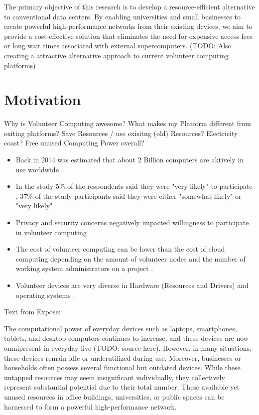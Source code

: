 The primary objective of this research is to develop a resource-efficient alternative to conventional data centers. By enabling universities and small businesses to create powerful high-performance networks from their existing devices, we aim to provide a cost-effective solution that eliminates the need for expensive access fees or long wait times associated with external supercomputers. (TODO: Also creating a attractive alternative approach to current volunteer computing platforms)

\section{Motivation}
\label{sec:intro:motivation}
Why is Volunteer Computing awesome? What makes my Platform different from exiting platforms? Save Resources / use exisitng (old) Resources? Electricity coast? Free unused Computing Power overall?

\begin{itemize}
    \item Back in 2014 was estimated that about 2 Billion computers are aktively in use worldwide \cite{intro:computersAmount,relatedwork:boinc1}
    \item In the study 5\% of the respondents said they were "very likely" to participate \cite{intro:volunteerStudy,relatedwork:boinc1}, 37\% of the study participants said they were either "somewhat likely" or "very likely" \cite{intro:volunteerStudy}
    \item Privacy and security concerns negatively impacted willingness to participate in volunteer computing \cite{intro:volunteerStudy}
    \item The cost of volunteer computing can be lower than the cost of cloud computing depending on the amount of volunteer nodes and the number of working system administrators on a project \cite{intro:costAnalysis}.
    \item Volunteer devices are very diverse in Hardware (Resources and Drivers) and operating systems \cite{intro:diverseDevices}. 
\end{itemize}

Text from Expose:

The computational power of everyday devices such as laptops, smartphones, tablets, and desktop computers continues to increase, and these devices are now omnipresent in everyday live (TODO: source here). However, in many situations, these devices remain idle or underutilized during use. Moreover, businesses or households often possess several functional but outdated devices. While these untapped resources may seem insignificant individually, they collectively represent substantial potential due to their total number. These available yet unused resources in office buildings, universities, or public spaces can be harnessed to form a powerful high-performance network.

